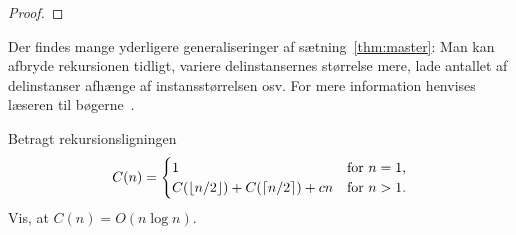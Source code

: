 \begin{proof}
%
%
%
\end{proof}

Der findes mange yderligere generaliseringer af sætning~\ref{thm:master}:
Man kan  afbryde rekursionen tidligt, variere delinstansernes størrelse mere, lade antallet af delinstanser afhænge af instansstørrelsen osv.
For mere information henvises læseren til bøgerne~\cite{GKP94,Sedgewick-Flajolet}.

\begin{exerc}
  Betragt rekursionsligningen
\[ C(n) = \begin{cases}    1 & \text{for $n = 1$},\\
           C(\lfloor n/2\rfloor)+C(\lceil n/2\rceil)+ cn & \text{for $n > 1$.}
\end{cases} \]
Vis, at $C(n) = O(n\log n)$.
\end{exerc}

